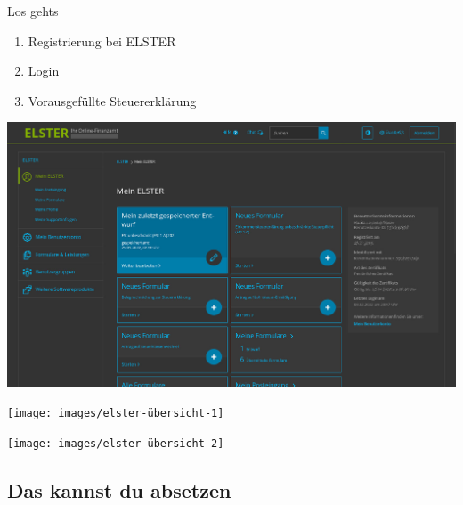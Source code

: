 \documentclass{beamer}
\begin{document}
			\begin{frame}{Los gehts}
				\begin{enumerate}
					\item Registrierung bei ELSTER
					\item Login
					\item Vorausgefüllte Steuererklärung
				\end{enumerate}
			\end{frame}
		
			\begin{frame}
				\begin{center}
					\vspace{-0.6cm}
					\hspace*{-0.91cm}
					\includegraphics[scale=0.24]{images/elster-1}
				\end{center}
			\end{frame}
		
			\begin{frame}
				\begin{center}
					\vspace{-0.6cm}
					\hspace*{-0.91cm}
					\texttt{[image: images/elster-übersicht-1]}
				\end{center}
			\end{frame}
		
			\begin{frame}
				\begin{center}
					\vspace{-0.6cm}
					\hspace*{-0.91cm}
					\texttt{[image: images/elster-übersicht-2]}
				\end{center}
			\end{frame}
		
		\subsection{Das kannst du absetzen}
		
\end{document}
